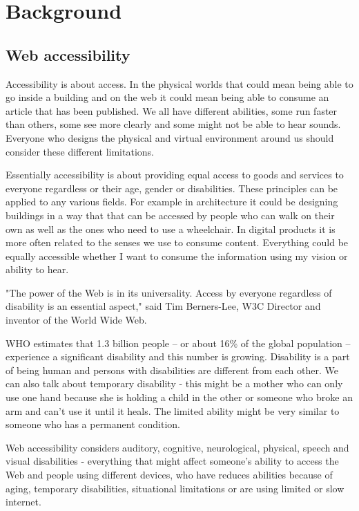 \documentclass{master_thesis}
\begin{document}
\section{Background}

\subsection{Web accessibility}

Accessibility is about access. In the physical worlds that could mean being able to go inside a building and on the web it could mean being able to consume an article that has been published. We all have different abilities, some run faster than others, some see more clearly and some might not be able to hear sounds. Everyone who designs the physical and virtual environment around us should consider these different limitations.

Essentially accessibility is about providing equal access to goods and services to everyone regardless or their age, gender or disabilities. These principles can be applied to any various fields. For example in architecture it could be designing buildings in a way that that can be accessed by people who can walk on their own as well as the ones who need to use a wheelchair. In digital products it is more often related to the senses we use to consume content. Everything could be equally accessible whether I want to consume the information  using my vision or ability to hear.

"The power of the Web is in its universality. Access by everyone regardless of disability is an essential aspect," said Tim Berners-Lee, W3C Director and inventor of the World Wide Web\citep{WWWC1997}.

WHO estimates that 1.3 billion people – or about 16\% of the global population – experience a significant disability and this number is growing. Disability is a part of being human and persons with disabilities are different from each other. \citep{WHO2022} We can also talk about temporary disability - this might be a mother who can only use one hand because she is holding a child in the other or someone who broke an arm and can't use it until it heals. The limited ability might be very similar to someone who has a permanent condition.

Web accessibility considers auditory, cognitive, neurological, physical, speech and visual  disabilities - everything that might affect someone's ability to access the Web and people using different devices, who have reduces abilities because of aging, temporary disabilities, situational limitations or are using limited or slow internet. \citep{Henry2022}
\end{document}
